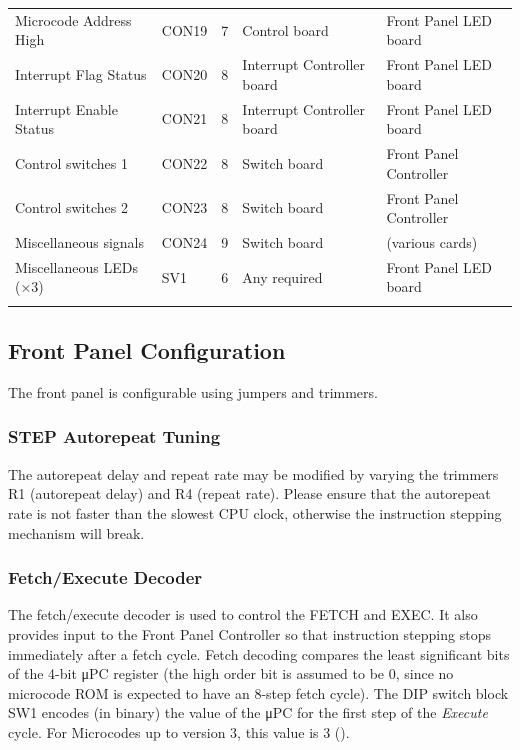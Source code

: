 \documentclass[11pt,a4paper,twocolumns]{article}
\newcommand{\lt}[1]{\textsf{#1}}
\newcommand{\sw}[1]{\textsf{#1}}
\newcommand{\schpt}[1]{\textsf{#1}}
\newcommand\abbr[1]{#1}
\begin{document}
\begin{table}[tb]
\begin{tabular}{llcll}
    Microcode Address High   & CON19 & 7 & Control board & Front Panel LED board \\
    Interrupt Flag Status    & CON20 & 8 & Interrupt Controller board & Front Panel LED board \\
    Interrupt Enable Status  & CON21 & 8 & Interrupt Controller board & Front Panel LED board \\
    Control switches 1       & CON22 & 8 & Switch board & Front Panel Controller \\
    Control switches 2       & CON23 & 8 & Switch board & Front Panel Controller \\
    Miscellaneous signals    & CON24 & 9 & Switch board & (various cards) \\
    Miscellaneous LEDs (×3)  & SV1   & 6 & Any required & Front Panel LED board \\
    \noalign{\smallskip}\hline\noalign{\smallskip}
  \end{tabular}
\end{table}

\subsection{Front Panel Configuration}

The front panel is configurable using jumpers and trimmers.

\subsubsection{\sw{STEP} Autorepeat Tuning}

The autorepeat delay and repeat rate may be modified by varying the
trimmers \schpt{R1} (autorepeat delay) and \schpt{R4} (repeat
rate). Please ensure that the autorepeat rate is not faster than the
slowest CPU clock, otherwise the instruction stepping mechanism will
break.

\subsubsection{Fetch/Execute Decoder}

The fetch/execute decoder is used to control the \lt{FETCH} and
\lt{EXEC}. It also provides input to the Front Panel Controller so
that instruction stepping stops immediately after a fetch cycle. Fetch
decoding compares the least significant bits of the 4-bit μPC register
(the high order bit is assumed to be 0, since no microcode ROM is
expected to have an 8-step fetch cycle). The \abbr{DIP} switch block
\schpt{SW1} encodes (in binary) the value of the μPC for the first
step of the {\em Execute\/} cycle. For Microcodes up to version 3,
this value is 3 ({}).
\end{document}
